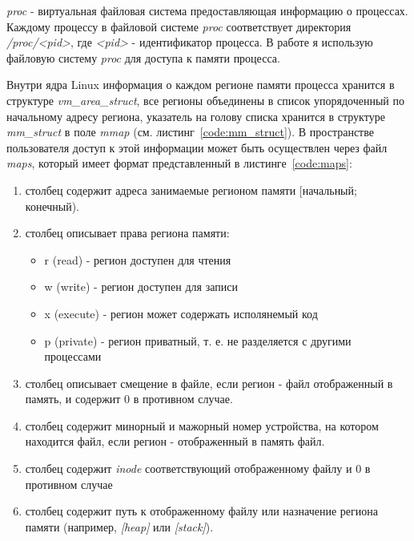 \textit{proc} - виртуальная файловая система предоставляющая информацию о процессах. Каждому процессу в файловой системе \textit{proc} соответствует директория \textit{/proc/<pid>}, где \textit{<pid>} - идентификатор процесса. В работе я использую файловую систему \textit{proc} для доступа к памяти процесса.

Внутри ядра Linux информация о каждом регионе памяти процесса хранится в структуре \textit{vm\_area\_struct}, все регионы объединены в список упорядоченный по начальному адресу региона, указатель на голову списка хранится в структуре \textit{mm\_struct} в поле \textit{mmap} (см. листинг~\ref{code:mm_struct}). В пространстве пользователя доступ к этой информации может быть осуществлен через файл \textit{maps}, который имеет формат представленный в листинге~\ref{code:maps}: 

\begin{enumerate}

    \item столбец содержит адреса занимаемые регионом памяти [начальный; конечный).

    \item столбец описывает права региона памяти:

        \begin{itemize}

            \item r (read) - регион доступен для чтения
            \item w (write) - регион доступен для записи
            \item x (execute) - регион может содержать исполянемый код
            \item p (private) - регион приватный, т. е. не разделяется с другими процессами

        \end{itemize}

    \item столбец описывает смещение в файле, если регион - файл отображенный в память, и содержит 0 в противном случае.

    \item столбец содержит минорный и мажорный номер устройства, на котором находится файл, если регион - отображенный в память файл.

    \item столбец содержит \textit{inode} соответствующий отображенному файлу и 0 в противном случае

    \item столбец содержит путь к отображенному файлу или назначение региона памяти (например, \textit{[heap]} или \textit{[stack]}).

\end{enumerate}

